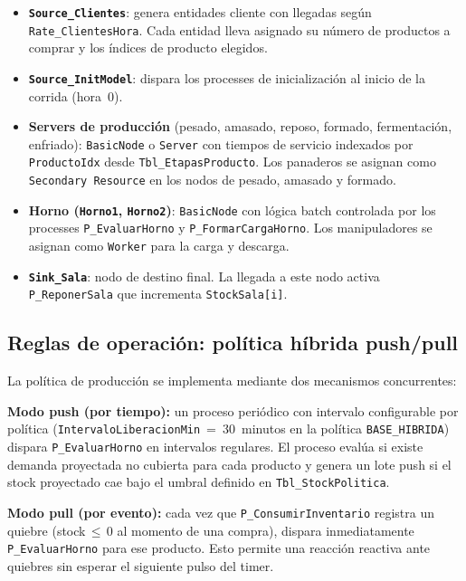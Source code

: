 \documentclass[12pt]{article}
\begin{document}
\begin{itemize}
  \item \textbf{\texttt{Source\_Clientes}}: genera entidades cliente con llegadas según \texttt{Rate\_ClientesHora}. Cada entidad lleva asignado su número de productos a comprar y los índices de producto elegidos.
  \item \textbf{\texttt{Source\_InitModel}}: dispara los processes de inicialización al inicio de la corrida (hora~0).
  \item \textbf{Servers de producción} (pesado, amasado, reposo, formado, fermentación, enfriado): \texttt{BasicNode} o \texttt{Server} con tiempos de servicio indexados por \texttt{ProductoIdx} desde \texttt{Tbl\_EtapasProducto}. Los panaderos se asignan como \texttt{Secondary Resource} en los nodos de pesado, amasado y formado.
  \item \textbf{Horno (\texttt{Horno1}, \texttt{Horno2})}: \texttt{BasicNode} con lógica batch controlada por los processes \texttt{P\_EvaluarHorno} y \texttt{P\_FormarCargaHorno}. Los manipuladores se asignan como \texttt{Worker} para la carga y descarga.
  \item \textbf{\texttt{Sink\_Sala}}: nodo de destino final. La llegada a este nodo activa \texttt{P\_ReponerSala} que incrementa \texttt{StockSala[i]}.
\end{itemize}

\subsection{Reglas de operación: política híbrida push/pull}

La política de producción se implementa mediante dos mecanismos concurrentes:

\textbf{Modo push (por tiempo):} un proceso periódico con intervalo configurable por política (\texttt{IntervaloLiberacionMin}~=~30~minutos en la política \texttt{BASE\_HIBRIDA}) dispara \texttt{P\_EvaluarHorno} en intervalos regulares. El proceso evalúa si existe demanda proyectada no cubierta para cada producto y genera un lote push si el stock proyectado cae bajo el umbral definido en \texttt{Tbl\_StockPolitica}.

\textbf{Modo pull (por evento):} cada vez que \texttt{P\_ConsumirInventario} registra un quiebre (stock\,$\leq$\,0 al momento de una compra), dispara inmediatamente \texttt{P\_EvaluarHorno} para ese producto. Esto permite una reacción reactiva ante quiebres sin esperar el siguiente pulso del timer.
\end{document}
